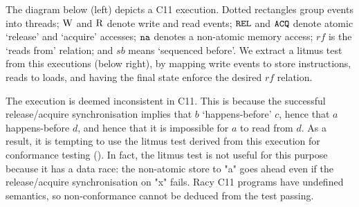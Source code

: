 \begin{Example}
\label{ex:lb_without_cd}
%
The diagram below (left) depicts a C11 execution. Dotted rectangles group
events into threads; ${\rm W}$ and ${\rm R}$ denote write and read
events; ${\tt REL}$ and ${\tt ACQ}$ denote atomic `release' and `acquire'
accesses; ${\tt na}$ denotes a non-atomic memory access; $rf$ is the `reads
from' relation; and $sb$ means `sequenced before'. We extract a litmus
test from this executions (below right), by mapping write events to
store instructions, reads to loads, and having the final state enforce
the desired $rf$ relation.
%
\begin{center}
\end{center}
%
The execution is deemed inconsistent in C11. This is because the
successful release/acquire synchronisation implies that $b$
`happens-before' $c$, hence that $a$ happens-before $d$, and hence
that it is impossible for $a$ to read from $d$. As a result, it is
tempting to use the litmus test derived from this execution for
conformance testing (). In fact, the litmus test is not useful for
this purpose because it has a data race: the non-atomic store to "a"
goes ahead even if the release/acquire synchronisation on "x"
fails. Racy C11 programs have undefined semantics, so non-conformance
cannot be deduced from the test passing.
\end{Example}


